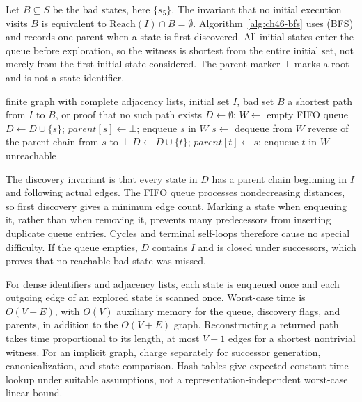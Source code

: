Let $B\subseteq S$ be the bad states, here $\{s_5\}$.
The invariant that no initial execution visits $B$ is equivalent to $\mathrm{Reach}(I)\cap B=\emptyset$.
Algorithm~\ref{alg:ch46-bfs} uses  (BFS) and records one parent when a state is first discovered.
All initial states enter the queue before exploration, so the witness is shortest from the entire initial set, not merely from the first initial state considered.
The parent marker $\bot$ marks a root and is not a state identifier.

\begin{algorithm}[tbp]
\caption{Search for a bad state and retain a shortest transition witness.}
\label{alg:ch46-bfs}
\begin{pseudocode}
\Require finite graph with complete adjacency lists, initial set $I$, bad set $B$
\Ensure a shortest path from $I$ to $B$, or proof that no such path exists
\State $D\gets\emptyset$; $W\gets$ empty FIFO queue
  \State $D\gets D\cup\{s\}$; $\mathit{parent}[s]\gets\bot$; enqueue $s$ in $W$
\EndFor
{}
  \State $s\gets$ dequeue from $W$
    \State \Return reverse of the parent chain from $s$ to $\bot$
  \EndIf
      \State $D\gets D\cup\{t\}$; $\mathit{parent}[t]\gets s$; enqueue $t$ in $W$
    \EndIf
  \EndFor
\EndWhile
\State \Return unreachable
\end{pseudocode}
\end{algorithm}

The discovery invariant is that every state in $D$ has a parent chain beginning in $I$ and following actual edges.
The FIFO queue processes nondecreasing distances, so first discovery gives a minimum edge count.
Marking a state when enqueuing it, rather than when removing it, prevents many predecessors from inserting duplicate queue entries.
Cycles and terminal self-loops therefore cause no special difficulty.
If the queue empties, $D$ contains $I$ and is closed under successors, which proves that no reachable bad state was missed.

For dense identifiers and adjacency lists, each state is enqueued once and each outgoing edge of an explored state is scanned once.
Worst-case time is $O(V+E)$, with $O(V)$ auxiliary memory for the queue, discovery flags, and parents, in addition to the $O(V+E)$ graph.
Reconstructing a returned path takes time proportional to its length, at most $V-1$ edges for a shortest nontrivial witness.
For an implicit graph, charge separately for successor generation, canonicalization, and state comparison.
Hash tables give expected constant-time lookup under suitable assumptions, not a representation-independent worst-case linear bound.

